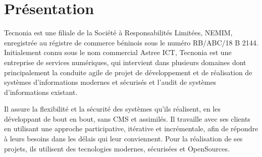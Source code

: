 \section{Présentation}

Tecnonia est une filiale de la Société à Responsabilités Limitées, NEMIM, enregistrée au régistre de commerce béninois sous le numéro RB/ABC/18 B 2144. Initialement connu sous le nom commercial Astree ICT, Tecnonia est une entreprise de services numériques, qui intervient dans plusieurs domaines dont principalement la conduite agile de projet de développement et de réalisation de systèmes d'informations modernes et sécurisés et l'audit de systèmes d'informations existant.

Il assure la flexibilité et la sécurité des systèmes qu'ils réalisent, en les développant de bout en bout, sans CMS et assimilés.
Il travaille avec ses clients en utilisant une approche participative, itérative et incrémentale, afin de répondre à leurs besoins dans les délais qui leur conviennent.
Pour la réalisation de ses projets, ils utilisent des tecnologies modernes, sécurisées et OpenSources. 


 